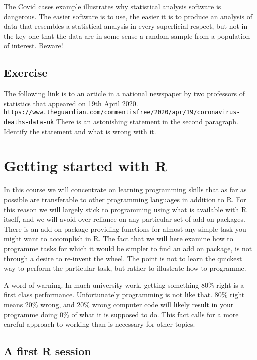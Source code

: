 \documentclass[10pt] {article}
\theoremstyle{definition}
\begin{document}
The Covid cases example illustrates why statistical analysis software is dangerous. The easier software is to use, the easier it is to produce an analysis of data that resembles a statistical analysis in every superficial respect, but not in the key one that the data are in some sense a random sample from a population of interest.  Beware!

\subsection*{Exercise}

The following link is to an article in a national newspaper by two professors of statistics that appeared on 19th April 2020.
{\small \lstinline+https://www.theguardian.com/commentisfree/2020/apr/19/coronavirus-deaths-data-uk+} 
There is an astonishing statement in the second paragraph. Identify the statement and what is wrong with it.


\section{Getting started with R}

In this course we will concentrate on learning programming skills that as far as possible are transferable to other programming languages in addition to R. For this reason we will largely stick to programming using what is available with R itself, and we will avoid over-reliance on any particular set of add on packages. There is an add on package providing functions for almost any simple task you might want to accomplish in R. The fact that we will here examine how to programme tasks for which it would be simpler to find an add on package, is not through a desire to re-invent the wheel. The point is not to learn the quickest way to perform the particular task, but rather to illustrate how to programme. 

A word of warning. In much university work, getting something 80\% right is a first class performance. Unfortunately programming is not like that. 80\% right means 20\% wrong, and 20\% wrong computer code will likely result in your programme doing 0\% of what it is supposed to do. This fact calls for a more careful approach to working than is necessary for other topics.  

\subsection{A first R session \label{firstR}}
\end{document}
